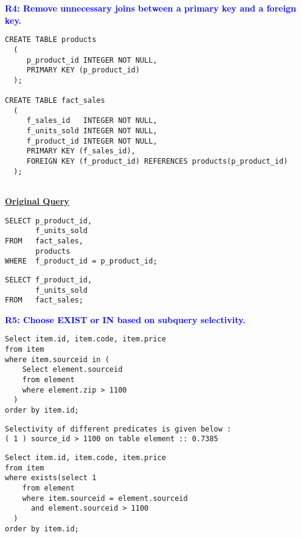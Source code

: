 \begin{flushleft}
\newpage
\noindent \textcolor{blue}{\large \textbf{R4: Remove unnecessary joins between a primary key and a foreign key.}}

\vspace{0.2in}
        \begin{verbatim}
CREATE TABLE products
  (
     p_product_id INTEGER NOT NULL,
     PRIMARY KEY (p_product_id)
  );

CREATE TABLE fact_sales
  (
     f_sales_id   INTEGER NOT NULL,
     f_units_sold INTEGER NOT NULL,
     f_product_id INTEGER NOT NULL,
     PRIMARY KEY (f_sales_id),
     FOREIGN KEY (f_product_id) REFERENCES products(p_product_id)
  ); 
  
  \end{verbatim}

        \item \textbf{\underline{Original Query}}
        \begin{verbatim}
SELECT p_product_id,
       f_units_sold
FROM   fact_sales,
       products
WHERE  f_product_id = p_product_id; \end{verbatim}

\vspace{0.2in}
\begin{verbatim}
SELECT f_product_id,
       f_units_sold
FROM   fact_sales; 

\end{verbatim}
\newpage
\noindent \textcolor{blue}{\large \textbf{R5: Choose EXIST or IN based on subquery selectivity.}}

\vspace{0.2in}
        \begin{verbatim}
Select item.id, item.code, item.price 
from item 
where item.sourceid in (
    Select element.sourceid 
    from element 
    where element.zip > 1100
  ) 
order by item.id;\end{verbatim}

\vspace{0.1in}
    \begin{verbatim}
Selectivity of different predicates is given below : 
( 1 ) source_id > 1100 on table element :: 0.7385
    \end{verbatim}
    
\vspace{0.1in}
\begin{verbatim}
Select item.id, item.code, item.price 
from item 
where exists(select 1 
    from element 
    where item.sourceid = element.sourceid 
      and element.sourceid > 1100
  ) 
order by item.id;
 \end{verbatim}
 

\end{flushleft}
